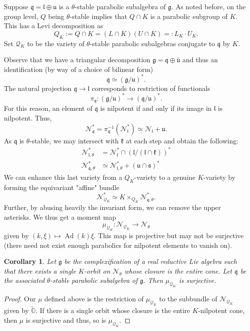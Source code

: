 \documentclass[letterpaper,twosided,11pt]{article}
\theoremstyle{plain}
\newtheorem{corollary}[theorem]{Corollary}
\theoremstyle{definition}
\theoremstyle{remark}
\newcommand{\OO}{\mathbb{O}}
\newcommand{\ds}{\oplus}
\newcommand{\lie}[1]{\mathfrak{#1}}
\newcommand{\Ad}{\operatorname{Ad}}
\begin{document}
Suppose $\lie{q}=\lie{l}\ds \lie{u}$ is a $\theta$-stable parabolic subalgebra of $\lie{g}.$ As noted before, on the group level, $Q$ being $\theta$-stable implies that $Q\cap K$ is a parabolic subgroup of $K.$ This has a Levi decomposition as \[ Q_K:=Q\cap K=(L\cap K)(U\cap K)=:L_K\cdot U_K.\] Set $\mathcal{Q}_K$ to be the variety of $\theta$-stable parabolic subalgebras conjugate to $\lie{q}$ by $K.$ 

Observe that we have a triangular decomposition $\lie{g}=\lie{q}\ds \bar{\lie{u}}$ and thus an identification (by way of a choice of bilinear form) \[\lie{q}\simeq  (\lie{g}/\lie{u})^*. \] The natural projection $\lie{q}\to \lie{l}$ corresponds to restriction of functionals \[\pi_\lie{q}:(\lie{g}/\lie{u})^*\to (\lie{q}/\lie{u})^* .\]
For this reason, an element of $\lie{q}$ is nilpotent if and only if its image in $\lie{l}$ is nilpotent. Thus, \[ \mathcal{N}_\lie{q}^*=\pi_\lie{q}^{-1}(\mathcal{N}_\lie{l}^*)\simeq \mathcal{N}_\lie{l}+\lie{u}.\] 
As $\lie{q}$ is $\theta$-stable, we may intersect with $\lie{k}$ at each step and obtain the following: \begin{align*}
	\mathcal{N}_{\lie{l},\theta}^*&=\mathcal{N}_\lie{l}^*\cap (\lie{l}/(\lie{l}\cap \lie{k}))^* \\ 
	\mathcal{N}_{\lie{q},\theta}^*&\simeq \mathcal{N}_{\lie{l},\theta}^*+(\lie{u}\cap \lie{s})^* 
\end{align*} 
We can enhance this last variety from a $Q_K$-variety to a genuine $K$-variety by forming the equivariant "affine" bundle \[ \mathcal{N}_{{\mathcal{Q}_K}}^*\simeq K\times_{Q_K} \mathcal{N}_{\lie{q},\theta}^* .\] 
Further, by abusing heavily the invariant form, we can remove the upper asterisks. We thus get a moment map \[ \mu_{\mathcal{Q}_K}: \mathcal{N}_{{\mathcal{Q}_K}}\to \mathcal{N}_\theta \] 
given by $(k,\xi)\mapsto \Ad(k)\xi.$
This map is projective but may not be surjective (there need not exist enough parabolics for nilpotent elements to vanish on). 

\begin{corollary} 
	Let $\lie{g}$ be the complexification of a real reductive Lie algebra such that there exists a single $K$-orbit on $\mathcal{N}_\theta$ whose closure is the entire cone. Let $\lie{q}$ be the associated $\theta$-stable parabolic subalgebra of $\lie{g}.$  Then $\mu_{\mathcal{Q}_K}$ is surjective. 
\end{corollary} 	   
\begin{proof} 
	Our $\mu$ defined above is the restriction of $\mu_{\mathcal{Q}_K}$ to the subbundle of $\mathcal{N}_{{\mathcal{Q}_K}}$ given by $\widetilde{\OO}.$ If there is a single orbit whose closure is the entire $K$-nilpotent cone, then $\mu$ is surjective and thus, so is $\mu_{\mathcal{Q}_K}.$ 
\end{proof} 
\end{document}
